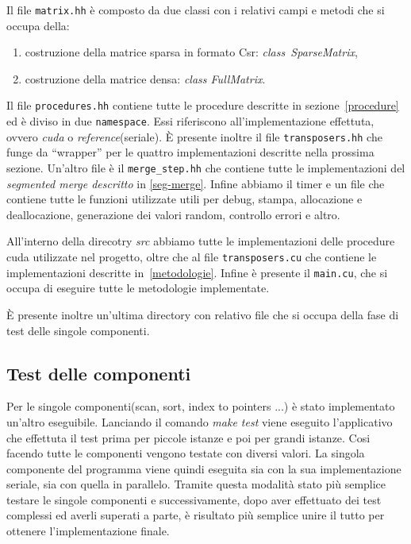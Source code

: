 \documentclass[]{IEEEtran}
\begin{document}
	Il file \texttt{matrix.hh} è composto da due classi con i relativi campi e metodi che si occupa della:
	\begin{enumerate}
		\item costruzione della matrice sparsa in formato Csr: \textit{class~SparseMatrix},
		\item costruzione della matrice densa: \textit{class FullMatrix}.
	\end{enumerate}
	Il file \texttt{procedures.hh} contiene tutte le procedure descritte in sezione~\ref{procedure} ed è diviso in due \texttt{namespace}. Essi riferiscono all'implementazione effettuta, ovvero \textit{cuda} o \textit{reference}(seriale).\newline
	È presente inoltre il file \texttt{transposers.hh} che funge da ``wrapper'' per le quattro implementazioni descritte nella prossima sezione.\newline
	Un'altro file è il \texttt{merge\_step.hh} che contiene tutte le implementazioni del \textit{segmented merge descritto} in \ref{seg-merge}.\newline
	Infine abbiamo il timer e un file che contiene tutte le funzioni utilizzate utili per debug, stampa, allocazione e deallocazione, generazione dei valori random, controllo errori e altro.\newline
	
	All'interno della direcotry \textit{src} abbiamo tutte le implementazioni delle procedure cuda utilizzate nel progetto, oltre che al file \texttt{transposers.cu} che contiene le implementazioni descritte in~\ref{metodologie}.\newline
	Infine è presente il \texttt{main.cu}, che si occupa di eseguire tutte le metodologie implementate.\newline

	È presente inoltre un'ultima directory con relativo file che si occupa della fase di test delle singole componenti.
	
	\subsection{Test delle componenti}	
	Per le singole componenti(scan, sort, index to pointers ...) è stato implementato un'altro eseguibile. Lanciando il comando \textit{make test} viene eseguito l'applicativo che effettuta il test prima per piccole istanze e poi per grandi istanze. Cosi facendo tutte le componenti vengono testate con diversi valori.\newline
	La singola componente del programma viene quindi eseguita sia con la sua implementazione seriale, sia con quella in parallelo. Tramite questa modalità stato più semplice testare le singole componenti e successivamente, dopo aver effettuato dei test complessi ed averli superati a parte, è risultato più semplice unire il tutto per ottenere l'implementazione finale.
	
\end{document}
